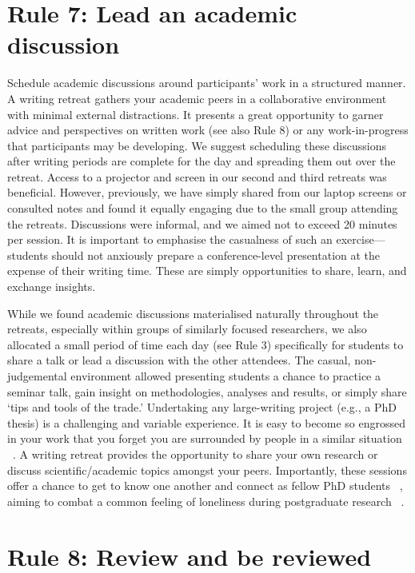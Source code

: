 \documentclass[10pt,letterpaper]{article}
\begin{document}
\section*{Rule 7: Lead an academic discussion}

Schedule academic discussions around participants' work in a structured manner. A writing retreat gathers your academic peers in a collaborative environment with minimal external distractions. It presents a great opportunity to garner advice and perspectives on written work (see also Rule 8) or any work-in-progress that participants may be developing. We suggest scheduling these discussions after writing periods are complete for the day and spreading them out over the retreat. Access to a projector and screen in our second and third retreats was beneficial. However, previously, we have simply shared from our laptop screens or consulted notes and found it equally engaging due to the small group attending the retreats. Discussions were informal, and we aimed not to exceed 20 minutes per session. It is important to emphasise the casualness of such an exercise---students should not anxiously prepare a conference-level presentation at the expense of their writing time. These are simply opportunities to share, learn, and exchange insights. 

While we found academic discussions materialised naturally throughout the retreats, especially within groups of similarly focused researchers, we also allocated a small period of time each day (see Rule 3) specifically for students to share a talk or lead a discussion with the other attendees. The casual, non-judgemental environment allowed presenting students a chance to practice a seminar talk, gain insight on methodologies, analyses and results, or simply share `tips and tools of the trade.' Undertaking any large-writing project (e.g., a PhD thesis) is a challenging and variable experience. It is easy to become so engrossed in your work that you forget you are surrounded by people in a similar situation ~\cite{wilson2019}. A writing retreat provides the opportunity to share your own research or discuss scientific/academic topics amongst your peers. Importantly, these sessions offer a chance to get to know one another and connect as fellow PhD students ~\cite{omeara2017, bernery2022}, aiming to combat a common feeling of loneliness during postgraduate research ~\cite{janta2014, mantai2019, mills2024study}.

\section*{Rule 8: Review and be reviewed}
\end{document}
